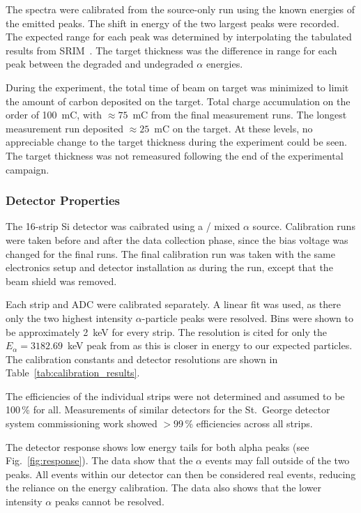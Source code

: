 The spectra were calibrated from the source-only run using the known energies
of the emitted peaks. The shift in energy of the two largest peaks were
recorded. The expected range for each peak was determined by interpolating the
tabulated results from SRIM~\cite{SRIM}. The target thickness was the difference in
range for each peak between the degraded and undegraded $\alpha$ energies.

During the experiment, the total time of beam on target was minimized to limit
the amount of carbon deposited on the target. Total charge accumulation on the
order of 100~mC, with $\approx 75$~mC from the final measurement runs. The
longest measurement run deposited $\approx 25$~mC on the target. At
these levels, no appreciable change to the target thickness during the
experiment could be seen. The target thickness was not remeasured following
the end of the experimental campaign.


\subsubsection{Detector Properties}
The 16-strip Si detector was caibrated using a /
mixed $\alpha$ source. Calibration runs were taken before and after the data
collection phase, since the bias voltage was changed for the final runs. The
final calibration run was taken with the same electronics setup and detector
installation as during the run, except that the beam shield was removed.

Each strip and ADC were calibrated separately. A linear fit was used, as there
only the two highest intensity $\alpha$-particle peaks were resolved. Bins
were shown to be approximately 2~keV for every strip. The resolution is cited
for only the $E_{\alpha} = 3182.69$~keV peak from  as this is
closer in energy to our expected particles. The calibration constants and
detector resolutions are shown in Table~\ref{tab:calibration_results}.

The efficiencies of the individual strips were not determined and assumed to be
100\,\% for all. Measurements of similar detectors for the St.\ George detector
system commissioning work showed $>99$\,\% efficiencies across all strips.

The detector response shows low energy tails for both alpha peaks (see
Fig.~\ref{fig:response}). The data show that the $\alpha$ events may fall
outside of the two peaks. All events within our detector can then be considered
real events, reducing the reliance on the energy calibration. The data also
shows that the lower intensity  $\alpha$ peaks cannot be resolved.


